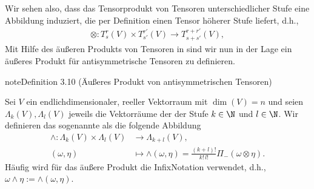 \documentclass[letterpaper,10pt,english]{jupyterBook}
\begin{document}
\sphinxAtStartPar
Wir sehen also, dass das Tensorprodukt von Tensoren unterschiedlicher Stufe eine Abbildung induziert, die per Definition einen Tensor höherer Stufe liefert, d.h.,
\begin{equation*}
\begin{split}\otimes : T^r_s(V) \times T^{r'}_{s'}(V) \rightarrow T^{r+r'}_{s+s'}(V),\end{split}
\end{equation*}
\sphinxAtStartPar
Mit Hilfe des äußeren Produkts von Tensoren in {\hyperref[\detokenize{vektoranalysis/tensor:def:aeusseresProduktTensoren}]{}} sind wir nun in der Lage ein äußeres Produkt für antisymmetrische Tensoren zu definieren.
\label{vektoranalysis/tensor:def:aeusseresProdukt}
\begin{sphinxadmonition}{note}{Definition 3.10 (Äußeres Produkt von antisymmetrischen Tensoren)}



\sphinxAtStartPar
Sei \(V\) ein endlich\sphinxhyphen{}dimensionaler, reeller Vektorraum mit \(\operatorname{dim}(V) = n\) und seien \(\Lambda_k(V), \Lambda_l(V)\) jeweils die Vektorräume der  der Stufe \(k\in\N\) und \(l\in\N\).
Wir definieren das sogenannte  als die folgende Abbildung
\begin{equation*}
\begin{split}\wedge : \Lambda_k(V) \times \Lambda_l(V) &\rightarrow \Lambda_{k+l}(V),\\
(\omega, \eta) &\mapsto \wedge(\omega,\eta) = \frac{(k+l)!}{k! \, l!} \Pi_-(\omega \otimes \eta).\end{split}
\end{equation*}
\sphinxAtStartPar
Häufig wird für das äußere Produkt die Infix\sphinxhyphen{}Notation verwendet, d.h., \(\omega \wedge \eta :=  \wedge(\omega,\eta)\).
\end{sphinxadmonition}
\end{document}
